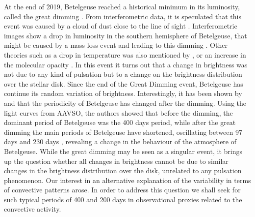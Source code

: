 \documentclass{aa}
\begin{document}


At the end of 2019, Betelgeuse reached a historical minimum in its luminosity, called the great dimming \citep{guinan_fall_2020}. 
From interferometric data, it is speculated that this event was caused by a cloud of dust close to the line of sight \citep{montarges_dusty_2021}. 
Interferometric images show a drop in luminosity in the southern hemisphere of Betelgeuse, that might be caused by a mass loss event and leading to this dimming \citep{dupree_great_2022}. Other theories such as a drop in temperature was also mentioned by \cite{harper_photospheric_2020}, or an increase in the molecular opacity \citep{kravchenko_atmosphere_2021}. In this event it turns out that a change in brightness was not due to any kind of pulsation but to a change on the 
brightness distribution over the stellar disk.
Since the end of the Great Dimming event, Betelgeuse has continue its random variation of brightness. 
Interestingly, 
it has been shown by \cite{jadlovsky_analysis_2023} and \cite{dupree_great_2022} that the periodicity of Betelgeuse has changed after the dimming. Using the light curves from AAVSO, 
the authors showed that before the dimming, the dominant period of Betelgeuse was the 400 days period, while after the great dimming the main periods of Betelgeuse have shortened, oscillating between 97 days and 230 days \citep{dupree_great_2022}, revealing a change in the behaviour of the atmosphere of Betelgeuse.
While the great dimming may be seen as 
a singular event, it brings up the question whether all changes in brightness cannot be due to similar changes in the brightness 
distribution over the disk, unrelated to any pulsation phenomenon. 
Our interest in an alternative explanation of the variability
in terms  of convective patterns arose. In order to address this question we shall seek for such typical periods of 400 and 200 days in  
observational proxies related to the convective activity.\\
\end{document}

